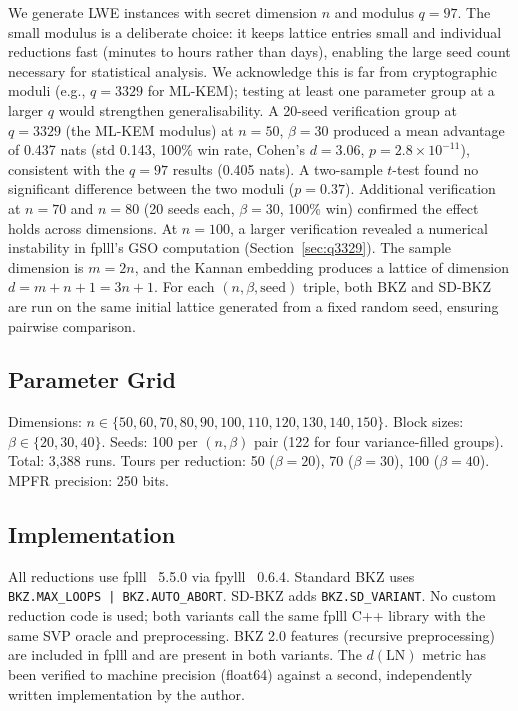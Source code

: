 \documentclass[journal=cic,version=preprint]{iacrj}
\begin{document}
We generate LWE instances with secret dimension $n$ and modulus $q=97$. The small modulus is a deliberate choice: it keeps lattice entries small and individual reductions fast (minutes to hours rather than days), enabling the large seed count necessary for statistical analysis. We acknowledge this is far from cryptographic moduli (e.g., $q=3329$ for ML-KEM); testing at least one parameter group at a larger $q$ would strengthen generalisability. A 20-seed verification group at $q=3329$ (the ML-KEM modulus) at $n=50$, $\beta=30$ produced a mean advantage of 0.437 nats (std 0.143, 100\% win rate, Cohen's $d=3.06$, $p=2.8\times 10^{-11}$), consistent with the $q=97$ results (0.405 nats). A two-sample $t$-test found no significant difference between the two moduli ($p=0.37$). Additional verification at $n=70$ and $n=80$ (20 seeds each, $\beta=30$, 100\% win) confirmed the effect holds across dimensions. At $n=100$, a larger verification revealed a numerical instability in fplll's GSO computation (Section~\ref{sec:q3329}). The sample dimension is $m=2n$, and the Kannan embedding produces a lattice of dimension $d = m+n+1 = 3n+1$. For each $(n, \beta, \mathrm{seed})$ triple, both BKZ and SD-BKZ are run on the same initial lattice generated from a fixed random seed, ensuring pairwise comparison.

\subsection{Parameter Grid}

\begin{sloppypar}
Dimensions: $n \in \{50, 60, 70, 80, 90, 100, 110, 120, 130, 140, 150\}$. Block sizes: $\beta \in \{20, 30, 40\}$. Seeds: 100 per $(n, \beta)$ pair (122 for four variance-filled groups). Total: 3{,}388 runs. Tours per reduction: 50 ($\beta=20$), 70 ($\beta=30$), 100 ($\beta=40$). MPFR precision: 250 bits.
\end{sloppypar}

\subsection{Implementation}

All reductions use fplll~\cite{fplll} 5.5.0 via fpylll~\cite{fpylll} 0.6.4. Standard BKZ uses \texttt{BKZ.MAX\_LOOPS\,|\,BKZ.AUTO\_ABORT}. SD-BKZ adds \texttt{BKZ.SD\_VARIANT}. No custom reduction code is used; both variants call the same fplll C++ library with the same SVP oracle and preprocessing. BKZ 2.0 features (recursive preprocessing) are included in fplll and are present in both variants. The $d(\mathrm{LN})$ metric has been verified to machine precision (float64) against a second, independently written implementation by the author.
\end{document}
